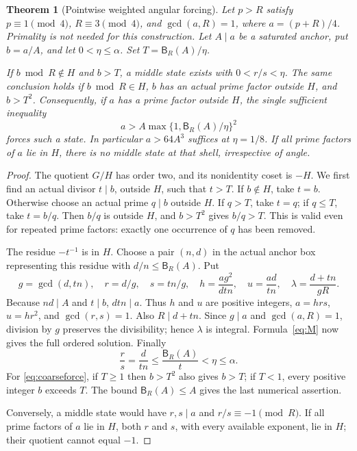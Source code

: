 \documentclass[11pt]{article}
\newtheorem{theorem}{Theorem}[section]
\theoremstyle{definition}\newtheorem{definition}[theorem]{Definition}
\theoremstyle{remark}\newtheorem{remark}[theorem]{Remark}
\newcommand{\B}{\mathsf B}
\begin{document}
\begin{theorem}[Pointwise weighted angular forcing]\label{thm:forcing}
Let $p>R$ satisfy $p\equiv1\pmod4$, $R\equiv3\pmod4$, and
$\gcd(a,R)=1$, where $a=(p+R)/4$. Primality is not needed for this construction. Let $A\mid a$ be a saturated anchor, put $b=a/A$, and let $0<\eta\le\alpha$. Set $T=\B_R(A)/\eta$.

If $b\bmod R\notin H$ and $b>T$, a middle state exists with $0<r/s<\eta$. The same conclusion holds if $b\bmod R\in H$, $b$ has an actual prime factor outside $H$, and $b>T^2$.
Consequently, if $a$ has a prime factor outside $H$, the single sufficient inequality
\begin{equation}\label{eq:coarseforce}
 a>A\max\{1,\B_R(A)/\eta\}^2
\end{equation}
forces such a state. In particular $a>64A^3$ suffices at $\eta=1/8$.
If all prime factors of $a$ lie in $H$, there is no middle state at that shell, irrespective of angle.
\end{theorem}
\begin{proof}
The quotient $G/H$ has order two, and its nonidentity coset is $-H$. We first find an actual divisor $t\mid b$, outside $H$, such that $t>T$.
If $b\notin H$, take $t=b$. Otherwise choose an actual prime $q\mid b$ outside $H$. If $q>T$, take $t=q$; if $q\le T$, take $t=b/q$. Then $b/q$ is outside $H$, and $b>T^2$ gives $b/q>T$. This is valid even for repeated prime factors: exactly one occurrence of $q$ has been removed.

The residue $-t^{-1}$ is in $H$. Choose a pair $(n,d)$ in the actual anchor box representing this residue with $d/n\le\B_R(A)$. Put
\begin{equation}\label{eq:packetmap}
 g=\gcd(d,tn),\quad r=d/g,\quad s=tn/g,\quad
 h=\frac{ag^2}{dtn},\quad
 u=\frac{ad}{tn},\quad
 \lambda=\frac{d+tn}{gR}.
\end{equation}
Because $nd\mid A$ and $t\mid b$, $dtn\mid a$. Thus $h$ and $u$ are positive integers, $a=hrs$, $u=hr^2$, and $\gcd(r,s)=1$. Also $R\mid d+tn$. Since $g\mid a$ and $\gcd(a,R)=1$, division by $g$ preserves the divisibility; hence $\lambda$ is integral. Formula~\eqref{eq:M} now gives the full ordered solution. Finally
\[
 \frac rs=\frac d{tn}\le\frac{\B_R(A)}t<\eta\le\alpha.
\]
For \eqref{eq:coarseforce}, if $T\ge1$ then $b>T^2$ also gives $b>T$; if $T<1$, every positive integer $b$ exceeds $T$. The bound $\B_R(A)\le A$ gives the last numerical assertion.

Conversely, a middle state would have $r,s\mid a$ and $r/s\equiv-1\pmod R$. If all prime factors of $a$ lie in $H$, both $r$ and $s$, with every available exponent, lie in $H$; their quotient cannot equal $-1$.
\end{proof}
\end{document}
